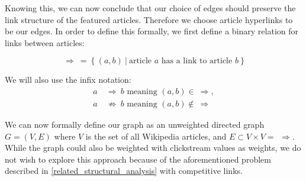 Knowing this, we can now conclude that our choice of edges should preserve the link structure of the featured articles. Therefore we choose article hyperlinks to be our edges. In order to define this formally, we first define a binary relation for links between articles:

$$\Rightarrow\ =\ \{\ (a,b)\ |\ \text{article } a \text{ has a link to article } b\ \}$$

We will also use the infix notation:
\begin{align*}
a\ &\Rightarrow\ b \text{ meaning } (a,b) \in\ \Rightarrow,\\
a\ &\not\Rightarrow\ b \text{ meaning } (a,b) \not\in\ \Rightarrow
\end{align*}

We can now formally define our graph as an unweighted directed graph $G = (V,E)$ where $V$ is the set of all Wikipedia articles, and $E\subset V \times V = \ \, \Rightarrow$. While the graph could also be weighted with clickstream values as weights, we do not wish to explore this approach because of the aforementioned problem described in \cref{related_structural_analysis} with competitive links.